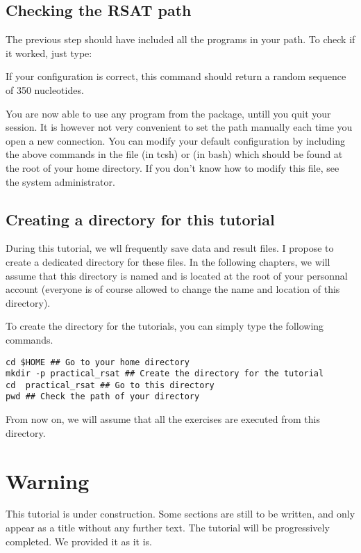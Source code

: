 \subsection{Checking the RSAT path}

 The previous step should have included all the \RSAT programs in
your path.  To check if it worked, just type:


If your configuration is correct, this command should return a random
sequence of 350 nucleotides.

You are now able to use any program from the \RSAT package, untill you
quit your session. It is however not very convenient to set the path
manually each time you open a new connection. You can modify your
default configuration by including the above commands in the file
 (in tcsh) or  (in bash) which should be
found at the root of your home directory. If you don't know how to
modify this file, see the system administrator.

\subsection{Creating a directory for this tutorial}

During this tutorial, we wll frequently save data and result files. I
propose to create a dedicated directory for these files. In the
following chapters, we will assume that this directory is named
 and is located at the root of your personnal
account (everyone is of course allowed to change the name and location
of this directory).

To create the directory for the tutorials, you can simply type the
following commands.

{\color{Blue} \begin{footnotesize}
\begin{verbatim}
cd $HOME ## Go to your home directory
mkdir -p practical_rsat ## Create the directory for the tutorial
cd  practical_rsat ## Go to this directory
pwd ## Check the path of your directory
\end{verbatim} \end{footnotesize}
}

From now on, we will assume that all the exercises are executed
from this directory.


\section{Warning}

This tutorial is under construction. Some sections are still to be
written, and only appear as a title without any further text. The
tutorial will be progressively completed. We provided it as it is.
